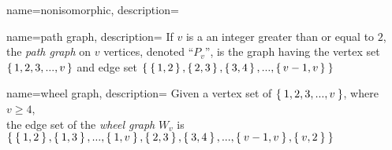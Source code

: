 {
  name={nonisomorphic},
  description={}
}

{
  name={path graph},
  description={%
    If $v$ is a an integer greater than or equal to $2$, the \textsl{path graph}
    on $v$ vertices, denoted ``$P_{v}$'', is the graph having the vertex set
    $\set{1,2,3,...,v}$ and edge set
    $\Set{\set{1,2},\set{2,3},\set{3,4},...,\set{v-1,v}}$%
  }
}

{
  name={wheel graph},
  description={%
    Given a vertex set of $\Set{1,2,3,...,v}$, where $v \ge 4$, \\
    the edge set of the \textsl{wheel graph} $W_{v}$ is
    $\Set{\Set{1,2},\Set{1,3},...,
      \Set{1,v},\Set{2,3},\Set{3,4},...,
      \Set{v-1,v},\Set{v,2}}$%
  }
}
